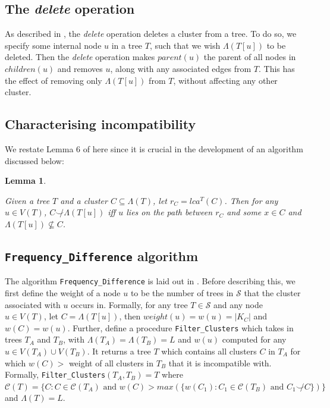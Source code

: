 \documentclass{article}
\newcommand{\compatible}{\smile}
\newcommand{\leafset}{\Lambda}
\newtheorem{incompatibility}{Lemma}
\begin{document}
    \subsection{The \textit{delete} operation}
    As described in \cite{jansson2018algorithms}, the \textit{delete} operation deletes a cluster from a tree. To do so, we specify some internal node $u$ in a tree $T$, such that we wish $\leafset(T[u])$ to be deleted. Then the \textit{delete} operation makes $parent(u)$ the parent of all nodes in $children(u)$ and removes $u$, along with any associated edges from $T$. This has the effect of removing only $\leafset(T[u])$ from $T$, without affecting any other cluster.

    \subsection{Characterising incompatibility}
    We restate Lemma 6 of \cite{jansson2018algorithms} here since it is crucial in the development of an algorithm discussed below:
    \newline

    \begin{incompatibility}
        \label{lem:incompatibility}

        Given a tree $T$ and a cluster $C \subseteq \leafset(T)$, let $r_C = lca^T(C)$. Then for any $u \in V(T)$, $C \not\compatible \leafset(T[u])$ iff $u$ lies on the path between $r_C$ and some $x \in C$ and $\leafset(T[u]) \not\subseteq C$.
    \end{incompatibility}

    \subsection{\texttt{Frequency\_Difference} algorithm}
    The algorithm \texttt{Frequency\_Difference} is laid out in \cite{jansson2018algorithms}. Before describing this, we first define the weight of a node $u$ to be the number of trees in $\mathcal{S}$ that the cluster associated with $u$ occurs in. Formally, for any tree $T \in \mathcal{S}$ and any node $u \in V(T)$, let $C = \leafset(T[u])$, then $weight(u) = w(u) = |K_C|$ and $w(C) = w(u)$. Further, define a procedure \texttt{Filter\_Clusters} which takes in trees $T_A$ and $T_B$, with $\leafset(T_A) = \leafset(T_B) = L$ and $w(u)$ computed for any $u \in V(T_A) \cup V(T_B)$. It returns a tree $T$ which contains all clusters $C$ in $T_A$ for which $w(C) > $ weight of all clusters in $T_B$ that it is incompatible with. Formally, \texttt{Filter\_Clusters}$(T_A, T_B) = T$ where $\mathcal{C}(T) = \{C : C \in \mathcal{C}(T_A) \text{ and } w(C) > max(\{w(C_1) : C_1 \in \mathcal{C}(T_B) \text{ and } C_1 \not\compatible C\})\}$ and $\leafset(T) = L$.
\end{document}
